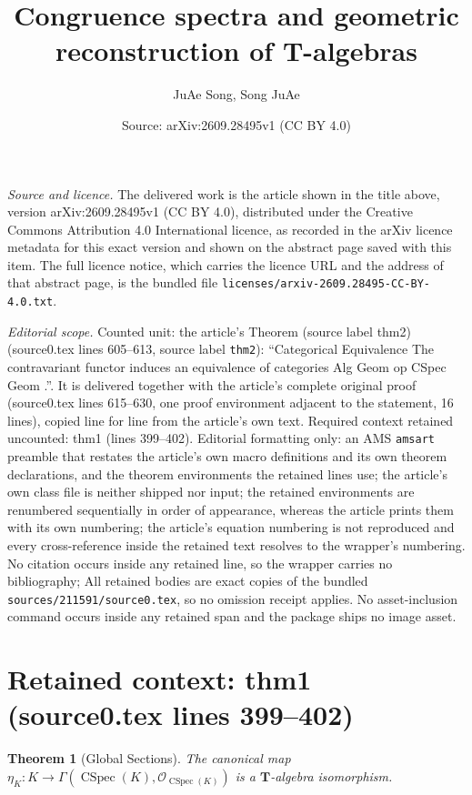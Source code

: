 \documentclass[10pt,a4paper]{amsart}
\title[Congruence spectra and geometric reconstruction of $\boldsymbol{T}$-algebras]{Congruence spectra and geometric reconstruction of $\boldsymbol{T}$-algebras}
\author{JuAe Song, Song JuAe}
\date{Source: arXiv:2609.28495v1 (CC BY 4.0)}
\theoremstyle{plain}
\newtheorem{theorem}{Theorem}[section]
\theoremstyle{definition}
\begin{document}
\maketitle

\noindent\emph{Source and licence.} The delivered work is the article shown in the title above, version arXiv:2609.28495v1 (CC BY 4.0), distributed under the Creative Commons Attribution 4.0 International licence, as recorded in the arXiv licence metadata for this exact version and shown on the abstract page saved with this item. The full licence notice, which carries the licence URL and the address of that abstract page, is the bundled file \texttt{licenses/arxiv-2609.28495-CC-BY-4.0.txt}.
\par\smallskip

\noindent\textit{Editorial scope.} Counted unit: the article's Theorem (source label thm2) (source0.tex lines 605--613, source label \texttt{thm2}): ``Categorical Equivalence The contravariant functor induces an equivalence of categories Alg Geom op CSpec Geom .''. It is delivered together with the article's complete original proof (source0.tex lines 615--630, one proof environment adjacent to the statement, 16 lines), copied line for line from the article's own text. Required context retained uncounted: thm1 (lines 399--402). Editorial formatting only: an AMS \texttt{amsart} preamble that restates the article's own macro definitions and its own theorem declarations, and the theorem environments the retained lines use; the article's own class file is neither shipped nor input; the retained environments are renumbered sequentially in order of appearance, whereas the article prints them with its own numbering; the article's equation numbering is not reproduced and every cross-reference inside the retained text resolves to the wrapper's numbering. No citation occurs inside any retained line, so the wrapper carries no bibliography; All retained bodies are exact copies of the bundled \texttt{sources/211591/source0.tex}, so no omission receipt applies. No asset-inclusion command occurs inside any retained span and the package ships no image asset.


\section*{Retained context: thm1 (source0.tex lines 399--402)}

\begin{theorem}[Global Sections]
    \label{thm1}
The canonical map $\eta_K : K \to \Gamma(\operatorname{CSpec}(K), \mathcal{O}_{\operatorname{CSpec}(K)})$ is a $\boldsymbol{T}$-algebra isomorphism.
\end{theorem}
\end{document}
